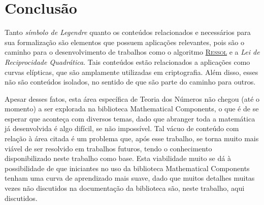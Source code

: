 \chapter{Conclusão}
\label{cap:conclusao}

Tanto \textit{símbolo de Legendre} quanto os conteúdos relacionados e necessários para sua formalização são elementos que possuem aplicações relevantes, pois são o caminho para o desenvolvimento de trabalhos como o algoritmo \hyperref[algo:ressol]{\textsc{Ressol}} e a \textit{Lei de Reciprocidade Quadrática}. Tais conteúdos estão relacionados a aplicações como curvas elípticas, que são amplamente utilizadas em criptografia. Além disso, esses não são conteúdos isolados, no sentido de que são parte do caminho para outros.

Apesar desses fatos, esta área específica de Teoria dos Números não chegou (até o momento) a ser explorada na biblioteca Mathematical Components, o que é de se esperar que aconteça com diversos temas, dado que abranger toda a matemática já desenvolvida é algo difícil, se não impossível. Tal vácuo de conteúdo com relação à área citada é um problema que, após esse trabalho, se torna muito mais viável de ser resolvido em trabalhos futuros, tendo o conhecimento disponibilizado neste trabalho como base. Esta viabilidade muito se dá à possibilidade de que iniciantes no uso da biblioteca Mathematical Components tenham uma curva de aprendizado mais suave, dado que muitos detalhes muitas vezes não discutidos na documentação da biblioteca são, neste trabalho, aqui discutidos.


